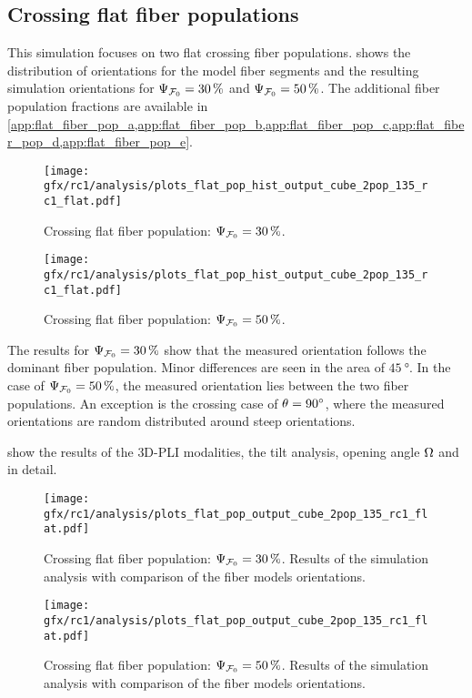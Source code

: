 \subsection{Crossing flat fiber populations}
\label{sec:resCrossFlat}
%
This simulation focuses on two flat crossing fiber populations.
 shows the distribution of orientations for the model fiber segments and the resulting simulation orientations for $\textnormal{$\Psi_{\textnormal{$\mathcal{F}_0$}}$} = \SI{30}{\percent}$ and $\textnormal{$\Psi_{\textnormal{$\mathcal{F}_0$}}$} = \SI{50}{\percent}$.
The additional fiber population fractions are available in \cref{app:flat_fiber_pop_a,app:flat_fiber_pop_b,app:flat_fiber_pop_c,app:flat_fiber_pop_d,app:flat_fiber_pop_e}.
\par
% 
\begin{figure}[!p]
\centering
\texttt{[image: gfx/rc1/analysis/plots\_flat\_pop\_hist\_output\_cube\_2pop\_135\_rc1\_flat.pdf]}
\caption{Crossing flat fiber population: $\textnormal{$\Psi_{\textnormal{$\mathcal{F}_0$}}$}=\SI{30}{\percent}$.}
\label{fig:flat_03_fiber_pop_hist}
% 
\vspace{2em}
\texttt{[image: gfx/rc1/analysis/plots\_flat\_pop\_hist\_output\_cube\_2pop\_135\_rc1\_flat.pdf]}
\caption{Crossing flat fiber population: $\textnormal{$\Psi_{\textnormal{$\mathcal{F}_0$}}$}=\SI{50}{\percent}$.}
\label{fig:flat_05_fiber_pop_hist}
\end{figure}
%
The results for $\textnormal{$\Psi_{\textnormal{$\mathcal{F}_0$}}$} = \SI{30}{\percent}$ show that the measured orientation follows the dominant fiber population.
Minor differences are seen in the area of $\SI{45}{\degree}$.
In the case of $\textnormal{$\Psi_{\textnormal{$\mathcal{F}_0$}}$} = \SI{50}{\percent}$, the measured orientation lies between the two fiber populations.
An exception is the crossing case of $\textnormal{$\theta$}=\SI{90}{\degree}$, where the measured orientations are random distributed around steep orientations.
\par
% 
 show the results of the \ac{3D-PLI} modalities, the tilt analysis, opening angle $\textnormal{$\Omega$}$ and \accvalue{} in detail.
\par
% 
\begin{figure}[!p]
\centering
\texttt{[image: gfx/rc1/analysis/plots\_flat\_pop\_output\_cube\_2pop\_135\_rc1\_flat.pdf]}
\caption{Crossing flat fiber population: $\textnormal{$\Psi_{\textnormal{$\mathcal{F}_0$}}$}=\SI{30}{\percent}$. Results of the simulation analysis with comparison of the fiber models orientations.}
\label{fig:flat_03_fiber_pop_rofl}
\end{figure}
%
\begin{figure}[!p]
\centering
\texttt{[image: gfx/rc1/analysis/plots\_flat\_pop\_output\_cube\_2pop\_135\_rc1\_flat.pdf]}
\caption{Crossing flat fiber population: $\textnormal{$\Psi_{\textnormal{$\mathcal{F}_0$}}$}=\SI{50}{\percent}$. Results of the simulation analysis with comparison of the fiber models orientations.}
\label{fig:flat_05_fiber_pop_rofl}
\end{figure}
